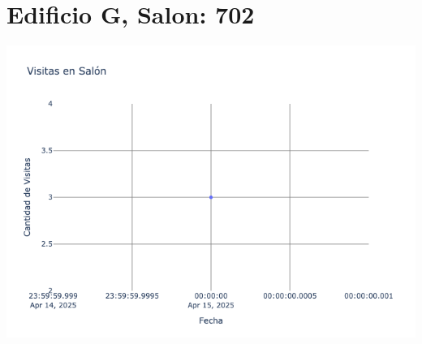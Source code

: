 \documentclass{article}
\begin{document}
    \section{Edificio G, Salon: 702}
    \noindent
    \begin{minipage}{0.48\textwidth}
        \centering
        \includegraphics[width=\textwidth]{../img/poli/VS702-180Dias-17-04-2025.png}
    \end{minipage}
    

    
\end{document}
